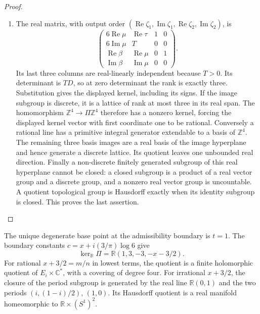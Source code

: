 \begin{proof}
\begin{enumerate}[label=\arabic*.,leftmargin=*]
\item The real matrix, with output order
\((\operatorname{Re}\zeta_1,\operatorname{Im}\zeta_1,
\operatorname{Re}\zeta_2,\operatorname{Im}\zeta_2)\), is
\[
 \begin{pmatrix}6\operatorname{Re}\mu&\operatorname{Re}\tau&1&0\\
 6\operatorname{Im}\mu&T&0&0\\
 \operatorname{Re}\beta&\operatorname{Re}\mu&0&1\\
 \operatorname{Im}\beta&\operatorname{Im}\mu&0&0\end{pmatrix}.
\]
Its last three columns are real-linearly independent because \(T>0\).
Its determinant is \(TD\), so at zero determinant the rank is exactly
three. Substitution gives the displayed kernel, including its signs.
If the image subgroup is discrete, it is a lattice of rank at most three
in its real span. The homomorphism \(\mathbb Z^4\to\Pi\mathbb Z^4\)
therefore has a nonzero kernel, forcing the displayed kernel vector with
first coordinate one to be rational. Conversely a rational line has a
primitive integral generator extendable to a basis of \(\mathbb Z^4\).
The remaining three basis images are a real basis of the image hyperplane
and hence generate a discrete lattice. Its quotient leaves one unbounded
real direction. Finally a non-discrete finitely generated subgroup of
this real hyperplane cannot be closed: a closed subgroup is a product of
a real vector group and a discrete group, and a nonzero real vector group
is uncountable. A quotient topological group is Hausdorff exactly when its
identity subgroup is closed. This proves the last assertion.
\end{enumerate}
\end{proof}

\begin{proposition}\hypertarget{tag-01QN}{}\label{fam:src:C.3.2}\label{fam:st:C.3.2}

The unique degenerate base point at the admissibility boundary is
\(t=1\). The boundary constants
\(c=x+i(3/\pi)\log6\) give
\[
 \ker_{\mathbb R}\Pi=\mathbb R(1,3,-3,-x-3/2).
\]
For rational $x+3/2=m/n$ in lowest terms, the quotient is a
finite holomorphic quotient of $E_i\times\mathbb C^*$, with a covering
of degree four. For irrational \(x+3/2\), the closure of the period subgroup is generated
by the real line \(\mathbb R(0,1)\) and the two periods
\((i,(1-i)/2)\), \((1,0)\). Its Hausdorff quotient is a real manifold
homeomorphic to \(\mathbb R\times(S^1)^2\).
\end{proposition}


